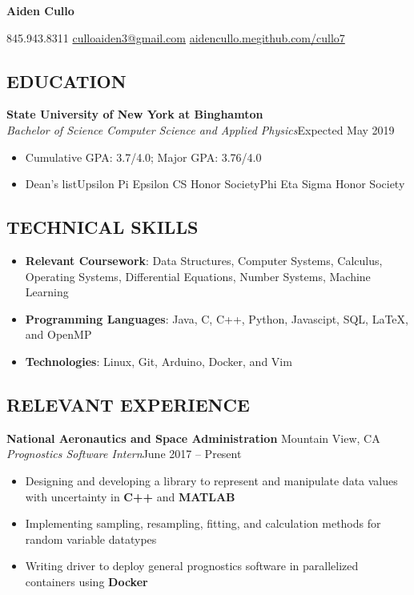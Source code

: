 \documentclass[10pt]{article}
\begin{document}
\centerline{\Huge \textbf{Aiden Cullo}}
\vspace{1.5mm}

\centerline{\small845.943.8311 \sbar\href{mailto:culloaiden3@gmail.com}{culloaiden3@gmail.com} \sbar \href{http://aidencullo.me}{aidencullo.me}\sbar\href{https://github.com/cullo7}{github.com/cullo7}}
\vspace{-1mm}
\subsection*{EDUCATION}

\spacedhrule{-0.1em}{0.9em}

\textbf{State University of New York at Binghamton} \\ 
\textit{Bachelor of Science Computer Science and Applied Physics}\hfill Expected May 2019
\begin{itemize}
\item Cumulative GPA: 3.7/4.0;  Major GPA: 3.76/4.0
	\item Dean's list\sbull Upsilon Pi Epsilon CS Honor Society\sbull Phi Eta Sigma Honor Society
\end{itemize}
\vspace{-1mm}
\subsection*{TECHNICAL SKILLS}
\spacedhrule{-0.1em}{0.9em}
\begin{itemize}
  \item \textbf{Relevant Coursework}: Data Structures, Computer Systems, Calculus, Operating Systems, Differential Equations, Number Systems, Machine Learning
  \item	\textbf{Programming Languages}: Java, C, C++, Python, Javascipt, SQL, \LaTeX, and OpenMP
  \item \textbf{Technologies}: Linux, Git, Arduino, Docker, and Vim
\end{itemize}
\vspace{-1mm}
\subsection*{RELEVANT EXPERIENCE}
\spacedhrule{-0.1em}{0.9em}

\textbf{National Aeronautics and Space Administration \hfill} Mountain View, CA \\ 
\textit{Prognostics Software Intern}\hfill June 2017 – Present
\begin{itemize}
	\item Designing and developing a library to represent and manipulate data values with uncertainty in \textbf{C++} and \textbf{MATLAB}
	\item Implementing sampling, resampling, fitting, and calculation methods for random variable datatypes
	\item Writing driver to deploy general prognostics software in parallelized containers using \textbf{Docker}
\end{itemize}
\end{document}
